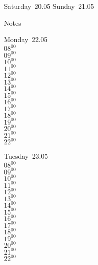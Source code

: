 \documentclass[11pt,a4paper]{book}\usepackage[]{graphicx}\usepackage[]{color}
\begin{document}
\begin{weekendbox}
  Saturday~20.05
  \tcblower
  Sunday~21.05
\end{weekendbox} %
\begin{notebox}
  Notes
\end{notebox}
\clearpage
\begin{headerbox}
\end{headerbox}
\begin{weekdaybox}
  Monday~22.05\\
  { 
  \vfill
  $08^{00}$\\
$09^{00}$\\
$10^{00}$\\
$11^{00}$\\
$12^{00}$\\
$13^{00}$\\
$14^{00}$\\
$15^{00}$\\
$16^{00}$\\
$17^{00}$\\
$18^{00}$\\
$19^{00}$\\
$20^{00}$\\
$21^{00}$\\
$22^{00}$\\
  }
\end{weekdaybox}
\begin{weekdaybox}
  Tuesday~23.05\\
  { 
  \vfill
  $08^{00}$\\
$09^{00}$\\
$10^{00}$\\
$11^{00}$\\
$12^{00}$\\
$13^{00}$\\
$14^{00}$\\
$15^{00}$\\
$16^{00}$\\
$17^{00}$\\
$18^{00}$\\
$19^{00}$\\
$20^{00}$\\
$21^{00}$\\
$22^{00}$\\
  }
\end{weekdaybox}
\end{document}
